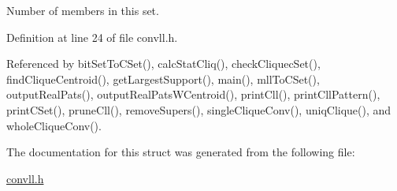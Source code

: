 Number of members in this set. 

Definition at line 24 of file convll.h.

Referenced by bit\-Set\-To\-CSet(), calc\-Stat\-Cliq(), check\-Cliquec\-Set(), find\-Clique\-Centroid(), get\-Largest\-Support(), main(), mll\-To\-CSet(), output\-Real\-Pats(), output\-Real\-Pats\-WCentroid(), print\-Cll(), print\-Cll\-Pattern(), print\-CSet(), prune\-Cll(), remove\-Supers(), single\-Clique\-Conv(), uniq\-Clique(), and whole\-Clique\-Conv().

The documentation for this struct was generated from the following file:\begin{CompactItemize}
\item 
\hyperlink{convll_8h}{convll.h}\end{CompactItemize}
